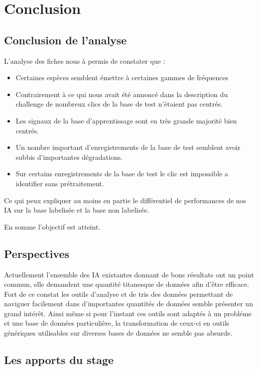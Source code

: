\hypertarget{conclusion}{%
\chapter{Conclusion}\label{conclusion}}

\section{Conclusion de l'analyse}

L'analyse des fiches nous à permis de constater que :
\begin{itemize}
\item Certaines espèces semblent émettre à certaines gammes de fréquences
\item Contrairement à ce qui nous avait été annoncé dans la description du challenge de nombreux clics de la base de test n'étaient pas centrés.
\item Les signaux de la base d'apprentissage sont en très grande majorité bien centrés.
\item Un nombre important d'enregistrements de la base de test semblent avoir subbis d'importantes dégradations.
\item Sur certains enregistrements de la base de test le clic est impossible a identifier sans prétraitement.
\end{itemize}
Ce qui peux expliquer au moins en partie le différentiel de performances de nos IA sur la base labelisée et la base non labelisée.

En somme l'objectif est atteint.

\section{Perspectives}

Actuellement l'ensemble des IA existantes donnant de bons résultats ont un point commun, elle demandent une quantité titanesque de données afin d'être efficace. Fort de ce constat les outils d'analyse et de tris des données permettant de naviguer facilement dans d'importantes quantités de données semble présenter un grand intérêt. Ainsi même si pour l'instant ces outils sont adaptés à un probléme et une base de données particulière, la transformation de ceux-ci en outils génériques utilisables sur diverses bases de données ne semble pas absurde.

\section{Les apports du stage}
